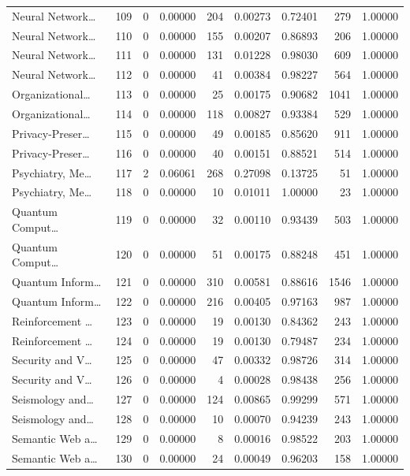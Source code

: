 \begin{table}
\begin{tabular}{lrrrrrrrr}
Neural Network… & 109 & 0 & 0.00000 & 204 & 0.00273 & 0.72401 & 279 & 1.00000 \\
Neural Network… & 110 & 0 & 0.00000 & 155 & 0.00207 & 0.86893 & 206 & 1.00000 \\
Neural Network… & 111 & 0 & 0.00000 & 131 & 0.01228 & 0.98030 & 609 & 1.00000 \\
Neural Network… & 112 & 0 & 0.00000 & 41 & 0.00384 & 0.98227 & 564 & 1.00000 \\
Organizational… & 113 & 0 & 0.00000 & 25 & 0.00175 & 0.90682 & 1041 & 1.00000 \\
Organizational… & 114 & 0 & 0.00000 & 118 & 0.00827 & 0.93384 & 529 & 1.00000 \\
Privacy-Preser… & 115 & 0 & 0.00000 & 49 & 0.00185 & 0.85620 & 911 & 1.00000 \\
Privacy-Preser… & 116 & 0 & 0.00000 & 40 & 0.00151 & 0.88521 & 514 & 1.00000 \\
Psychiatry, Me… & 117 & 2 & 0.06061 & 268 & 0.27098 & 0.13725 & 51 & 1.00000 \\
Psychiatry, Me… & 118 & 0 & 0.00000 & 10 & 0.01011 & 1.00000 & 23 & 1.00000 \\
Quantum Comput… & 119 & 0 & 0.00000 & 32 & 0.00110 & 0.93439 & 503 & 1.00000 \\
Quantum Comput… & 120 & 0 & 0.00000 & 51 & 0.00175 & 0.88248 & 451 & 1.00000 \\
Quantum Inform… & 121 & 0 & 0.00000 & 310 & 0.00581 & 0.88616 & 1546 & 1.00000 \\
Quantum Inform… & 122 & 0 & 0.00000 & 216 & 0.00405 & 0.97163 & 987 & 1.00000 \\
Reinforcement … & 123 & 0 & 0.00000 & 19 & 0.00130 & 0.84362 & 243 & 1.00000 \\
Reinforcement … & 124 & 0 & 0.00000 & 19 & 0.00130 & 0.79487 & 234 & 1.00000 \\
Security and V… & 125 & 0 & 0.00000 & 47 & 0.00332 & 0.98726 & 314 & 1.00000 \\
Security and V… & 126 & 0 & 0.00000 & 4 & 0.00028 & 0.98438 & 256 & 1.00000 \\
Seismology and… & 127 & 0 & 0.00000 & 124 & 0.00865 & 0.99299 & 571 & 1.00000 \\
Seismology and… & 128 & 0 & 0.00000 & 10 & 0.00070 & 0.94239 & 243 & 1.00000 \\
Semantic Web a… & 129 & 0 & 0.00000 & 8 & 0.00016 & 0.98522 & 203 & 1.00000 \\
Semantic Web a… & 130 & 0 & 0.00000 & 24 & 0.00049 & 0.96203 & 158 & 1.00000 \\

\end{tabular}
\end{table}

